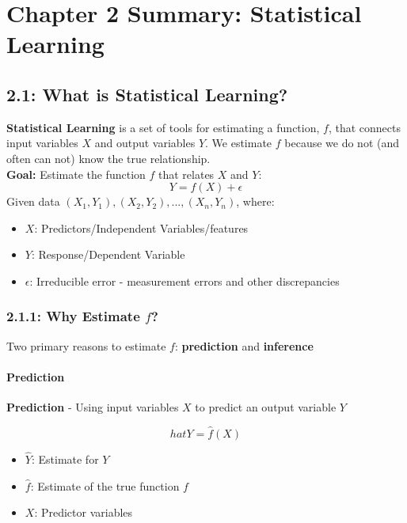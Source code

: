 

\section*{Chapter 2 Summary: Statistical Learning}\label{chapter-2-summary-statistical-learning}

\subsection*{2.1: What is Statistical Learning?}\label{what-is-statistical-learning}

\textbf{Statistical Learning} is a set of tools for estimating a function, \(f\), that connects input variables 
\(X\) and output variables \(Y\). We estimate \(f\) because we do not (and often can not)
know the true relationship. \\

\noindent \textbf{Goal:} Estimate the function \(f\) that relates \(X\) and \(Y\):
\begin{equation*}
    Y = f(X) + \epsilon
\end{equation*}
    Given data \((X_1, Y_1), (X_2, Y_2), ..., (X_n, Y_n)\), where:
\begin{itemize}
    \tightlist
    \item \(X\): Predictors/Independent Variables/features
    \item \(Y\): Response/Dependent Variable
    \item  \(\epsilon\): Irreducible error - measurement errors and other discrepancies
\end{itemize}

\subsubsection*{\texorpdfstring{2.1.1: Why Estimate \(f\)?}{2.1.1: Why Estimate f?}}\label{why-estimate-f}


Two primary reasons to estimate \(f\): \textbf{prediction} and \textbf{inference}
\paragraph{Prediction\\}
\textbf{Prediction} - Using input variables \(X\) to predict an output variable \(Y\)

\begin{equation*}
    hat Y = \hat f (X)
\end{equation*}
\begin{itemize}
\tightlist
\item \(\hat Y\): Estimate for \(Y\)
\item \(\hat f\): Estimate of the true function \(f\) 
\item \(X\): Predictor variables
\end{itemize}

